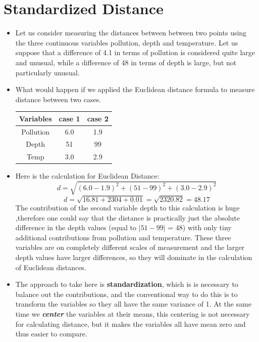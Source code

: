 \documentclass[a4paper,12pt]{report}
\begin{document}
\section{Standardized Distance}
\begin{itemize}
\item 
Let us consider measuring the distances between between two points using
the three continuous variables pollution, depth and temperature. Let us suppose that a difference of 4.1 in terms of pollution is considered quite large and unusual, while a difference of 48 in terms of depth is large, but not particularly unusual.
\item What would happen if we applied the Euclidean distance formula to measure distance between two cases.
\begin{center}
	\begin{tabular}{|c|c|c|}
		\hline
		Variables & case 1 & case 2 \\ \hline 
		Pollution & 6.0 & 1.9 \\
		Depth & 51 & 99 \\
		Temp & 3.0 & 2.9 \\
		\hline
	\end{tabular}
\end{center}

\item Here is the calculation for Euclidean Distance:
\[ d = \sqrt{(6.0 - 1.9)^2 + (51 - 99)^2 + (3.0 - 2.9)^2}   \]
\[ d = \sqrt{16.81 + 2304 + 0.01} = \sqrt{2320.82} = 48.17 \]
\noindent The contribution of the second variable depth to this calculation is huge ,therefore one could say
that the distance is practically just the absolute difference in the depth values (equal to
$|51-99|$ = 48) with only tiny additional contributions from pollution and temperature. These three variables are on
completely different scales of measurement and the larger depth values have larger differences, so they will dominate in the calculation of Euclidean distances.


\item The approach to take here is \textbf{standardization}, which is is necessary to balance out the contributions, and the
conventional way to do this is to transform the variables so they all have the same variance
of 1. At the same time we \textbf{\textit{center}} the variables at their means, this centering is not
necessary for calculating distance, but it makes the variables all have mean zero and thus
easier to compare. 


\end{itemize}
\end{document}
